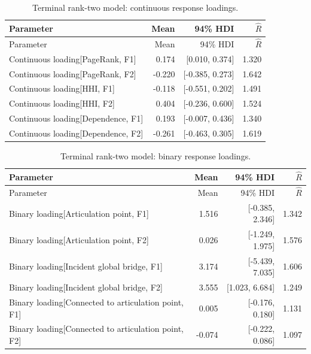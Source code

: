 \documentclass[pdftex,12pt,openright,a4paper,oneside]{book}
\begin{document}
\begin{longtable}{@{}p{}rrr@{}}
\caption{Terminal rank-two model: continuous response loadings.}\label{tab:terminal_rank2_26}\\
\toprule
Parameter & Mean & 94\% HDI & $\widehat R$ \\
\midrule\endfirsthead
\toprule
Parameter & Mean & 94\% HDI & $\widehat R$ \\
\midrule\endhead
Continuous loading[PageRank, F1] & 0.174 & [0.010, 0.374] & 1.320 \\
Continuous loading[PageRank, F2] & -0.220 & [-0.385, 0.273] & 1.642 \\
Continuous loading[HHI, F1] & -0.118 & [-0.551, 0.202] & 1.491 \\
Continuous loading[HHI, F2] & 0.404 & [-0.236, 0.600] & 1.524 \\
Continuous loading[Dependence, F1] & 0.193 & [-0.007, 0.436] & 1.340 \\
Continuous loading[Dependence, F2] & -0.261 & [-0.463, 0.305] & 1.619 \\
\bottomrule\end{longtable}

\begin{longtable}{@{}p{}rrr@{}}
\caption{Terminal rank-two model: binary response loadings.}\label{tab:terminal_rank2_41}\\
\toprule
Parameter & Mean & 94\% HDI & $\widehat R$ \\
\midrule\endfirsthead
\toprule
Parameter & Mean & 94\% HDI & $\widehat R$ \\
\midrule\endhead
Binary loading[Articulation point, F1] & 1.516 & [-0.385, 2.346] & 1.342 \\
Binary loading[Articulation point, F2] & 0.026 & [-1.249, 1.975] & 1.576 \\
Binary loading[Incident global bridge, F1] & 3.174 & [-5.439, 7.035] & 1.606 \\
Binary loading[Incident global bridge, F2] & 3.555 & [1.023, 6.684] & 1.249 \\
Binary loading[Connected to articulation point, F1] & 0.005 & [-0.176, 0.180] & 1.131 \\
Binary loading[Connected to articulation point, F2] & -0.074 & [-0.222, 0.086] & 1.097 \\
\bottomrule\end{longtable}
\end{document}
